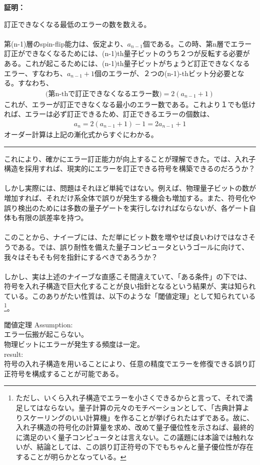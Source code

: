 \documentclass[a4paper,10.5pt]{article}
\numberwithin{equation}{section}
\newenvironment{proofbox}
{\begin{prooflabel}\textbf{証明：}\end{prooflabel}\vspace{0.8em}}
{\par\vspace{1em}\hrule\vspace{1em}}
\begin{document}
\begin{proofbox}
    訂正できなくなる最低のエラーの数を数える。\\
    \\
    第(n-1)層のspin-flip能力は、仮定より、$a_{n-1}$個である。この時、第n層でエラー訂正ができなくなるためには、(n-1)th量子ビットのうち２つが反転する必要がある。これが起こるためには、(n-1)th量子ビットがちょうど訂正できなくなるエラー、すなわち、$a_{n-1}+1$個のエラーが、２つの(n-1)-thビット分必要となる。すなわち、
    \begin{align*}
        \text{(第n-thで訂正できなくなるエラー数)}=2(a_{n-1}+1)
    \end{align*}
    これが、エラーが訂正できなくなる最小のエラー数である。これより１でも低ければ、エラーは必ず訂正できるため、訂正できるエラーの個数は、
    \begin{align*}
        a_{n}=2(a_{n-1}+1)-1=2a_{n-1}+1
    \end{align*}
    オーダー計算は上記の漸化式からすぐにわかる。
\end{proofbox}
これにより、確かにエラー訂正能力が向上することが理解できた。では、入れ子構造を採用すれば、現実的にエラーを訂正できる符号を構築できるのだろうか？\\
\\
しかし実際には、問題はそれほど単純ではない。例えば、物理量子ビットの数が増加すれば、それだけ系全体で誤りが発生する機会も増加する。また、符号化や誤り検出のためには多数の量子ゲートを実行しなければならないが、各ゲート自体も有限の誤差率を持つ。\\
\\
このことから、ナイーブには、ただ単にビット数を増やせば良いわけではなさそうである。では、誤り耐性を備えた量子コンピュータというゴールに向けて、我々はそもそも何を指針にするべきであろうか？\\
\\
しかし、実は上述のナイーブな直感こそ間違えていて、「ある条件」の下では、符号を入れ子構造で巨大化することが良い指針となるという結果が、実は知られている。このありがたい性質は、以下のような「閾値定理」として知られている\footnote{ただし、いくら入れ子構造でエラーを小さくできるからと言って、それで満足してはならない。量子計算の元々のモチベーションとして、「古典計算よりスケーリングのいい計算機」を作ることが挙げられたはずである。故に、入れ子構造の符号化の計算量を求め、改めて量子優位性を示さねば、最終的に満足のいく量子コンピュータとは言えない。この議題には本論では触れないが、結論としては、この誤り訂正符号の下でもちゃんと量子優位性が存在することが明らかとなっている。}。
\begin{theorembox}{閾値定理}
Assumption:\\
エラー伝搬が起こらない。\\
物理ビットにエラーが発生する頻度は一定。\\
result:\\
符号の入れ子構造を用いることにより、任意の精度でエラーを修復できる誤り訂正符号を構成することが可能である。
\end{theorembox}
\end{document}
